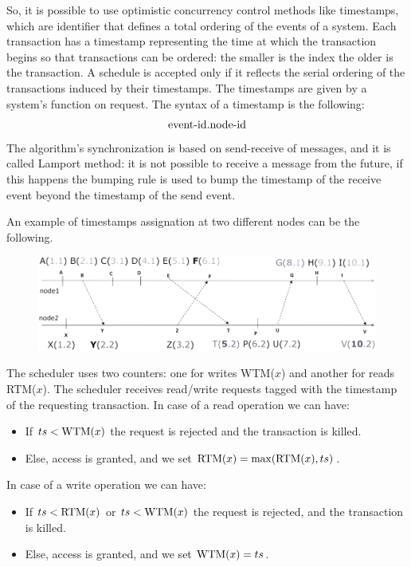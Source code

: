 \documentclass[12pt, a4paper]{report}
\newtheorem[style=M,bodystyle=\normalfont]{theorem}{Theorem}
\newtheorem[style=M,bodystyle=\normalfont]{corollary}{Corollary}
\newtheorem[style=M,bodystyle=\normalfont]{lemma}{Lemma}
\newtheorem[style=M,bodystyle=\normalfont]{definition}{Definition}
\begin{document}
    So, it is possible to use optimistic concurrency control methods like timestamps, which are identifier that defines a total ordering of the events of a system. Each transaction has a timestamp representing the time 
    at which the transaction begins so that transactions can be ordered: the smaller is the index the older is the transaction. A schedule is accepted only if it reflects the serial 
    ordering of the transactions induced by their timestamps. The timestamps are given by a system's function on request. The syntax of a timestamp is the following: 
    \[\textnormal{event-id}.\textnormal{node-id}\]
    The algorithm's synchronization is based on send-receive of messages, and it is called Lamport method: it is not possible to receive a message 
    from the future, if this happens the bumping rule is used to bump the timestamp of the receive event beyond the timestamp of the send event.     
    \begin{example}
        An example of timestamps assignation at two different nodes can be the following. 
        \begin{figure}[H]
            \centering
            \includegraphics[width=0.75\linewidth]{images/timestamps.png}
        \end{figure}
    \end{example}
    The scheduler uses two counters: one for writes WTM($x$) and another for reads RTM($x$). The scheduler receives read/write requests tagged with the timestamp of the 
    requesting transaction. In case of a read operation we can have: 
    \begin{itemize}
        \item If $ts<\textnormal{WTM}(x)$ the request is rejected and the transaction is killed. 
        \item Else, access is granted, and we set $\textnormal{RTM}(x)=\max(\textnormal{RTM}(x),ts)$. 
    \end{itemize}
    In case of a write operation we can have: 
    \begin{itemize}
        \item If $ts<\textnormal{RTM}(x)$ or $ts<\textnormal{WTM}(x)$ the request is rejected, and the  transaction is killed. 
        \item Else, access is granted, and we set $\textnormal{WTM}(x)=ts$. 
    \end{itemize}
\end{document}
